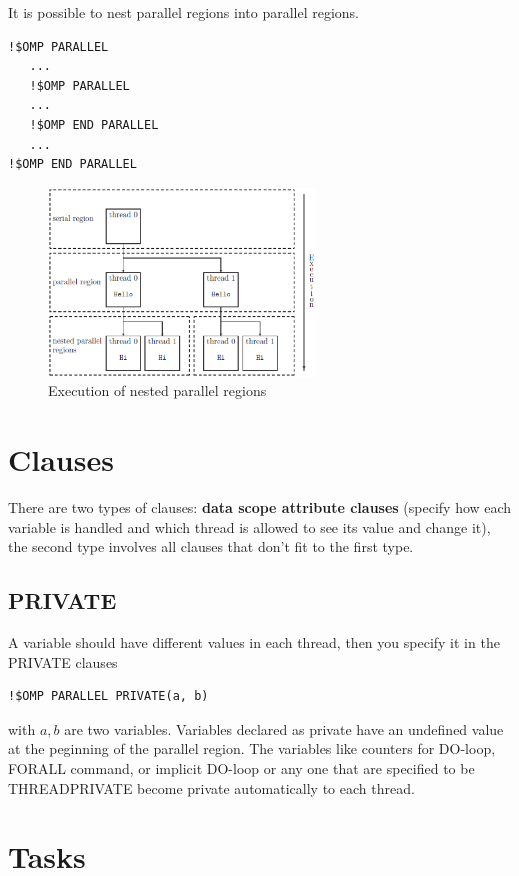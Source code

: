 It is possible to nest parallel regions into parallel regions. 
\begin{lstlisting}
!$OMP PARALLEL 
   ...
   !$OMP PARALLEL
   ...
   !$OMP END PARALLEL
   ...
!$OMP END PARALLEL
\end{lstlisting}
\begin{figure}[hbt]
  \centerline{\includegraphics[height=5cm,
    angle=0]{./images/nested_parallel_region.eps}}
\caption{Execution of nested parallel regions}
\label{fig:nested_parallel_reg}
\end{figure}

\section{Clauses}
\label{sec:clauses-1}

There are two types of clauses: {\bf data scope attribute clauses}
(specify how each variable is handled and which thread is allowed to
see its value and change it), the second type involves all clauses
that don't fit to the first type. 

\subsection{PRIVATE}
\label{sec:private}

A variable should have different values in each thread, then you
specify it in the PRIVATE clauses
\begin{lstlisting}
!$OMP PARALLEL PRIVATE(a, b)
\end{lstlisting}
with $a, b$ are two variables. Variables declared as private have an
undefined value at the peginning of the parallel region. The variables
like counters for DO-loop, FORALL command, or implicit DO-loop or any
one that are specified to be THREADPRIVATE become private
automatically to each thread. 


\section{Tasks}
\label{sec:tasks}

